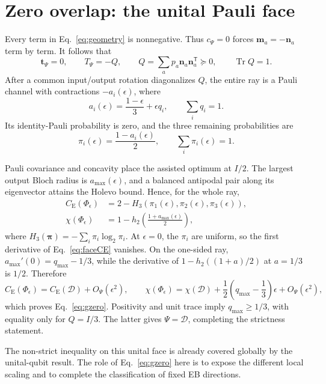 \documentclass[aip,jmp,reprint,amsmath,amssymb]{revtex4-2}
\newcommand{\D}{\mathcal{D}}
\newcommand{\Tr}{\operatorname{Tr}}
\newcommand{\eps}{\epsilon}
\newcommand{\CE}{C_{\mathrm E}}
\begin{document}
\section{Zero overlap: the unital Pauli face}
\label{sec:zero}

Every term in Eq.~\eqref{eq:geometry} is nonnegative.  Thus $c_\Psi=0$ forces $\bm m_a=-\bm n_a$ term by term.  It follows that
\begin{equation}
 \bm t_\Psi=0,\qquad T_\Psi=-Q,\qquad
 Q=\sum_ap_a\bm n_a\bm n_a^{\mathsf T}\succeq0,\qquad \Tr Q=1.
 \label{eq:Q}
\end{equation}
After a common input/output rotation diagonalizes $Q$, the entire ray is a Pauli channel with contractions $-a_i(\eps)$, where
\begin{equation}
 a_i(\eps)=\frac{1-\eps}{3}+\eps q_i,\qquad \sum_iq_i=1.
 \label{eq:ai}
\end{equation}
Its identity-Pauli probability is zero, and the three remaining probabilities are
\begin{equation}
 \pi_i(\eps)=\frac{1-a_i(\eps)}{2},\qquad \sum_i\pi_i(\eps)=1.
 \label{eq:pi}
\end{equation}

Pauli covariance and concavity place the assisted optimum at $I/2$.  The largest output Bloch radius is $a_{\max}(\eps)$, and a balanced antipodal pair along its eigenvector attains the Holevo bound.  Hence, for the whole ray,
\begin{align}
 \CE(\Phi_\eps)&=2-H_3(\pi_1(\eps),\pi_2(\eps),\pi_3(\eps)),\label{eq:faceCE}\\
 \chi(\Phi_\eps)&=1-h_2\!\left(\frac{1+a_{\max}(\eps)}{2}\right),\label{eq:facechi}
\end{align}
where $H_3(\bm\pi)=-\sum_i\pi_i\log_2\pi_i$.  At $\eps=0$, the $\pi_i$ are uniform, so the first derivative of Eq.~\eqref{eq:faceCE} vanishes.  On the one-sided ray, $a_{\max}'(0)=q_{\max}-1/3$, while the derivative of $1-h_2((1+a)/2)$ at $a=1/3$ is $1/2$.  Therefore
\begin{equation}
 \CE(\Phi_\eps)=\CE(\D)+O_\Psi(\eps^2),\qquad
 \chi(\Phi_\eps)=\chi(\D)+\frac12\left(q_{\max}-\frac13\right)\eps+O_\Psi(\eps^2),
 \label{eq:faceexpansions}
\end{equation}
which proves Eq.~\eqref{eq:gzero}.  Positivity and unit trace imply $q_{\max}\geq1/3$, with equality only for $Q=I/3$.  The latter gives $\Psi=\D$, completing the strictness statement.

The non-strict inequality on this unital face is already covered globally by the unital-qubit result.\cite{Belzig2023}  The role of Eq.~\eqref{eq:gzero} here is to expose the different local scaling and to complete the classification of fixed EB directions.
\end{document}

